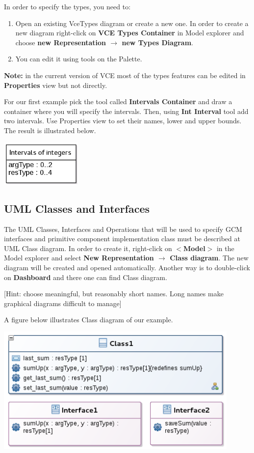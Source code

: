 \documentclass[12pt]{article}
\begin{document}
In order to specify the types, you need to:

\begin{enumerate}
\item
Open an existing VceTypes diagram or create a new one. In order to create a new diagram right-click on \textbf{VCE Types Container} in Model explorer and choose \textbf{new Representation $\rightarrow$ new Types Diagram}.
\item
You can edit it using tools on the Palette. 
\end{enumerate}

\textbf{Note: }in the current version of VCE most of the types features can be edited in \textbf{Properties} view but not directly.

For our first example pick the tool called \textbf{Intervals Container} and draw a container where you will specify the intervals. Then, using \textbf{Int Interval} tool add two intervals. Use Properties view to set their names, lower and upper bounds. The result is illustrated below.

     \centerline{
     \includegraphics[width=4cm]{draws/types.png}
     \label{fig:vce-proj}
     }

\subsection{UML Classes and Interfaces}\label{sec:uml-classes}
The UML Classes, Interfaces and Operations that will be used to specify GCM interfaces and primitive component implementation class must be described at UML Class diagram. In order to create it, right-click on \textbf{$<$Model$>$} in the Model explorer and select \textbf{New Representation $\rightarrow$ Class diagram}. The new diagram will be created and opened automatically. Another way is to double-click on \textbf{Dashboard} and there one can find Class diagram. 

[Hint: choose meaningful, but reasonably short names. Long names make graphical diagrams difficult to manage]

A figure below illustrates Class diagram of our example. 

     \centerline{
     \includegraphics[width=12cm]{draws/classes.png}
     \label{fig:vce-proj}
     }
\end{document}
